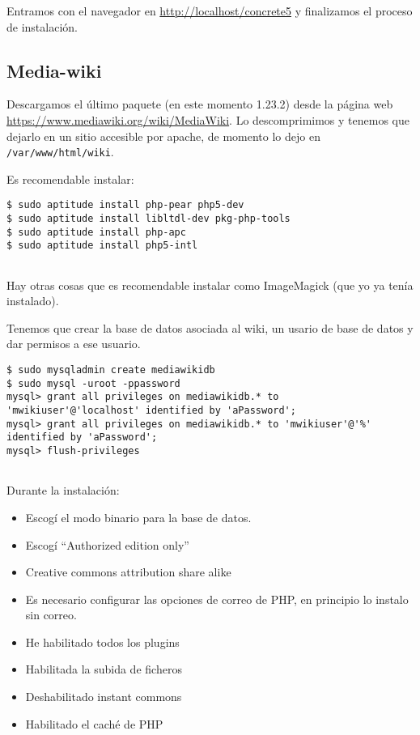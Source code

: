 Entramos con el navegador en \url{http://localhost/concrete5} y
finalizamos el proceso de instalación.

\subsection{Media-wiki}\label{media-wiki}

Descargamos el último paquete (en este momento 1.23.2) desde la página
web \url{https://www.mediawiki.org/wiki/MediaWiki}. Lo descomprimimos y
tenemos que dejarlo en un sitio accesible por apache, de momento lo dejo
en \texttt{/var/www/html/wiki}.

Es recomendable instalar:

\begin{verbatim}
$ sudo aptitude install php-pear php5-dev
$ sudo aptitude install libltdl-dev pkg-php-tools
$ sudo aptitude install php-apc
$ sudo aptitude install php5-intl
      
\end{verbatim}

Hay otras cosas que es recomendable instalar como ImageMagick (que yo ya
tenía instalado).

Tenemos que crear la base de datos asociada al wiki, un usario de base
de datos y dar permisos a ese usuario.

\begin{verbatim}
$ sudo mysqladmin create mediawikidb
$ sudo mysql -uroot -ppassword
mysql> grant all privileges on mediawikidb.* to 'mwikiuser'@'localhost' identified by 'aPassword';
mysql> grant all privileges on mediawikidb.* to 'mwikiuser'@'%' identified by 'aPassword';
mysql> flush-privileges
      
\end{verbatim}

Durante la instalación:

\begin{itemize}
\item
  Escogí el modo binario para la base de datos.
\item
  Escogí ``Authorized edition only''
\item
  Creative commons attribution share alike
\item
  Es necesario configurar las opciones de correo de PHP, en principio lo
  instalo sin correo.
\item
  He habilitado todos los plugins
\item
  Habilitada la subida de ficheros
\item
  Deshabilitado instant commons
\item
  Habilitado el caché de PHP
\end{itemize}


